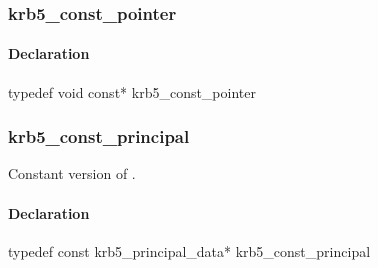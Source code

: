 \documentclass[letterpaper,10pt,english]{sphinxmanual}
\begin{document}

\begin{fulllineitems}
\label{appdev/refs/types/krb5_checksum:krb5_checksum.contents}
\end{fulllineitems}



\subsubsection{krb5\_const\_pointer}
\label{appdev/refs/types/krb5_const_pointer:krb5-const-pointer}\label{appdev/refs/types/krb5_const_pointer::doc}\label{appdev/refs/types/krb5_const_pointer:krb5-const-pointer-struct}

\begin{fulllineitems}
\label{appdev/refs/types/krb5_const_pointer:krb5_const_pointer}
\end{fulllineitems}



\paragraph{Declaration}
\label{appdev/refs/types/krb5_const_pointer:declaration}
typedef void const* krb5\_const\_pointer


\subsubsection{krb5\_const\_principal}
\label{appdev/refs/types/krb5_const_principal:krb5-const-principal-struct}\label{appdev/refs/types/krb5_const_principal:krb5-const-principal}\label{appdev/refs/types/krb5_const_principal::doc}

\begin{fulllineitems}
\label{appdev/refs/types/krb5_const_principal:krb5_const_principal}
\end{fulllineitems}


Constant version of {\hyperref[appdev/refs/types/krb5_principal_data:krb5_principal_data]{}} .


\paragraph{Declaration}
\label{appdev/refs/types/krb5_const_principal:declaration}
typedef const krb5\_principal\_data* krb5\_const\_principal
\end{document}
